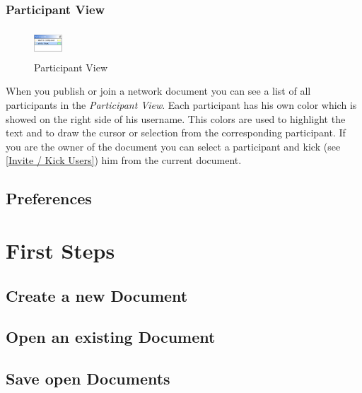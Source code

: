\documentclass[11pt,a4paper]{article}
\begin{document}
\subsubsection{Participant View}

\begin{figure}[htbp]
\begin{center}
  \includegraphics[height=30pt, width=30pt]{../images/usermanual/pview_overview.bmp.eps}
\caption{Participant View}
\label{default}
\end{center}
\end{figure}

When you publish or join a network document you can see a list of all participants in the \textit{Participant View}. Each participant has his own color which is showed on the right side of his username. This colors are used to highlight the text and to draw the cursor or selection from the corresponding participant. If you are the owner of the document you can select a participant and kick (see \ref{Invite / Kick Users}) him from the current document.

\subsection{Preferences}






\newpage
\section{First Steps}

\subsection{Create a new Document}

\subsection{Open an existing Document}

\subsection{Save open Documents}
\end{document}
